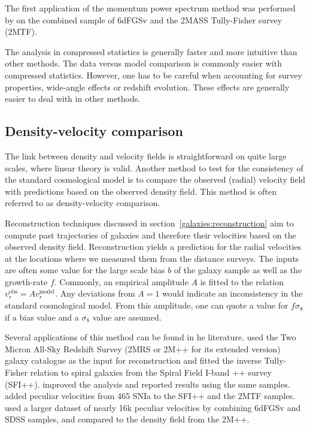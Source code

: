     The first application of the momentum power spectrum method was 
    performed by \cite{qinRedshiftspaceMomentumPower2019} on the combined 
    sample of 6dFGSv and the 2MASS Tully-Fisher survey (2MTF). 

    The analysis in compressed statistics is generally faster and more intuitive
    than other methods. The data versus model comparison is commonly easier with 
    compressed statistics. However, one has to be careful when accounting for 
    survey properties, wide-angle effects or redshift evolution. These effects
    are generally easier to deal with in other methods. 


    \subsection{Density-velocity comparison}
    \label{velocities:methods:comparison}

    The link between density and velocity fields is straightforward 
    on quite large scales, where linear theory is valid. 
    Another method to test for the consistency of the standard cosmological model 
    is to compare the observed (radial) velocity field with 
    predictions based on the observed density field. 
    This method is often referred to as density-velocity comparison.  

    Reconstruction techniques discussed in section~\ref{galaxies:reconstruction}
    aim to compute past trajectories of galaxies and therefore their velocities based 
    on the observed density field. Reconstruction yields a prediction for the radial 
    velocities at the locations where we measured them from the distance surveys.
    The inputs are often some value for the large scale bias $b$ of the galaxy sample 
    as well as the growth-rate $f$.  
    Commonly, an empirical amplitude $A$ is fitted to the relation $v_r^\text{obs} = A v_r^\text{model}$. 
    Any deviations from $A=1$ would indicate an inconsistency in the standard 
    cosmological model. From this amplitude, one can quote a value for $f\sigma_8$ 
    if a bias value and a $\sigma_8$ value are assumed.  

    Several applications of this method can be found in he literature. 
    \cite{davisLocalGravityLocal2011} used the Two Micron All-Sky Redshift Survey 
    (2MRS or 2M++ for its extended version) 
    galaxy catalogue as the input for reconstruction and fitted 
    the inverse Tully-Fisher relation to spiral galaxies from the 
    Spiral Field I-band ++ survey (SFI++). 
    \cite{carrickCosmologicalParametersComparison2015} improved the analysis 
    and reported results using the same samples. 
    \cite{boruahCosmicFlowsNearby2020} added peculiar velocities from 465 SNIa 
    to the SFI++ and the 2MTF samples. 
    \cite{saidJointAnalysis6dFGS2020} used a larger dataset of nearly 16k peculiar velocities 
    by combining 6dFGSv and SDSS samples, and compared to the density field from the 2M++. 
    
